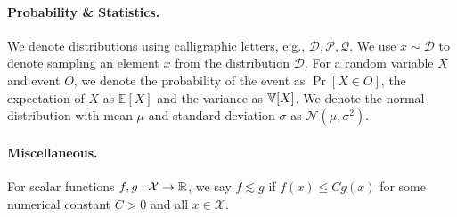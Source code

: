 \paragraph{Probability \& Statistics.}
We denote distributions using calligraphic letters, e.g., $\mathcal{D}, \mathcal{P}, \mathcal{Q}$. We use $x \sim \mathcal{D}$ to denote sampling an element $x$ from the distribution $\mathcal{D}$. For a random variable $X$ and event $O$, we denote the probability of the event as $\operatorname{Pr}[X\in O]$, the expectation of $X$ as $\mathbb{E}[X]$ and the variance as $\mathbb{V}[X]$. We denote the normal distribution with mean $\mu$ and standard deviation $\sigma$ as $\mathcal{N}\left(\mu, \sigma^2\right)$.

\paragraph{Miscellaneous.}
For scalar functions $f,g: \mathcal{X} \to \mathbb{R}$, we say $f \lesssim g$ if $f(x) \leq C g(x)$ for some numerical constant $C>0$ and all $x\in\mathcal{X}$. 
